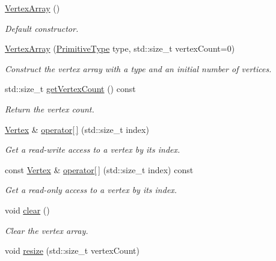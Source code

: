 \begin{DoxyCompactItemize}
\item 
\hyperlink{classsf_1_1_vertex_array_a15729e01df8fc0021f9774dfb56295c1}{Vertex\+Array} ()
\begin{DoxyCompactList}\small\item\em Default constructor. \end{DoxyCompactList}\item 
\hyperlink{classsf_1_1_vertex_array_a4bb1c29a0e3354a035075899d84f02f9}{Vertex\+Array} (\hyperlink{group__graphics_ga5ee56ac1339984909610713096283b1b}{Primitive\+Type} type, std\+::size\+\_\+t vertex\+Count=0)
\begin{DoxyCompactList}\small\item\em Construct the vertex array with a type and an initial number of vertices. \end{DoxyCompactList}\item 
std\+::size\+\_\+t \hyperlink{classsf_1_1_vertex_array_abda90e8d841a273d93164f0c0032bd8d}{get\+Vertex\+Count} () const
\begin{DoxyCompactList}\small\item\em Return the vertex count. \end{DoxyCompactList}\item 
\hyperlink{classsf_1_1_vertex}{Vertex} \& \hyperlink{classsf_1_1_vertex_array_a6006676417d91f42d0278f1abcfe4352}{operator\mbox{[}$\,$\mbox{]}} (std\+::size\+\_\+t index)
\begin{DoxyCompactList}\small\item\em Get a read-\/write access to a vertex by its index. \end{DoxyCompactList}\item 
const \hyperlink{classsf_1_1_vertex}{Vertex} \& \hyperlink{classsf_1_1_vertex_array_a6bfcf91c01c754e86ee8b44b6c79441b}{operator\mbox{[}$\,$\mbox{]}} (std\+::size\+\_\+t index) const
\begin{DoxyCompactList}\small\item\em Get a read-\/only access to a vertex by its index. \end{DoxyCompactList}\item 
void \hyperlink{classsf_1_1_vertex_array_a3654c424aca1f9e468f369bc777c839c}{clear} ()
\begin{DoxyCompactList}\small\item\em Clear the vertex array. \end{DoxyCompactList}\item 
void \hyperlink{classsf_1_1_vertex_array_a0c0fe239e8f9a54e64d3bbc96bf548c0}{resize} (std\+::size\+\_\+t vertex\+Count)

\end{DoxyCompactItemize}
